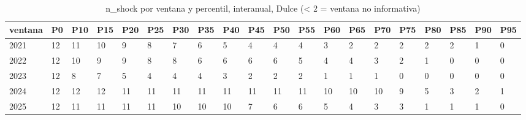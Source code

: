 \begin{table}[H]
\centering
\small
\caption{n\_shock por ventana y percentil, interanual, Dulce (< 2 = ventana no informativa)}
\label{tab:T_barrido_n_shock_interanual_dulce}
\begin{tabular}{llllllllllllllllllll}
\toprule
ventana & P0 & P10 & P15 & P20 & P25 & P30 & P35 & P40 & P45 & P50 & P55 & P60 & P65 & P70 & P75 & P80 & P85 & P90 & P95 \\
\midrule
2021 & 12 & 11 & 10 & 9 & 8 & 7 & 6 & 5 & 4 & 4 & 4 & 3 & 2 & 2 & 2 & 2 & 2 & 1 & 0 \\
2022 & 12 & 10 & 9 & 9 & 8 & 8 & 6 & 6 & 6 & 6 & 5 & 4 & 4 & 3 & 2 & 1 & 0 & 0 & 0 \\
2023 & 12 & 8 & 7 & 5 & 4 & 4 & 4 & 3 & 2 & 2 & 2 & 1 & 1 & 1 & 0 & 0 & 0 & 0 & 0 \\
2024 & 12 & 12 & 12 & 11 & 11 & 11 & 11 & 11 & 11 & 11 & 11 & 10 & 10 & 10 & 9 & 5 & 3 & 2 & 1 \\
2025 & 12 & 11 & 11 & 11 & 11 & 10 & 10 & 10 & 7 & 6 & 6 & 5 & 4 & 3 & 3 & 1 & 1 & 1 & 0 \\
\bottomrule
\end{tabular}
\end{table}